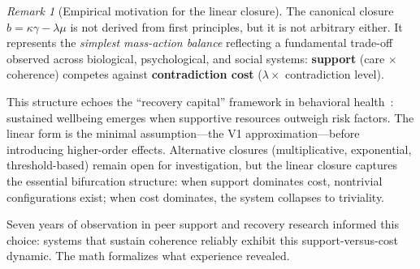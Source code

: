\documentclass[11pt]{article}
\theoremstyle{plain}
\theoremstyle{definition}
\theoremstyle{remark}
\newtheorem{remark}[theorem]{Remark}
\begin{document}
\begin{remark}[Empirical motivation for the linear closure]
The canonical closure \(b = \kappa\gamma - \lambda\mu\) is not derived from first principles, but it is not arbitrary either. It represents the \emph{simplest mass-action balance} reflecting a fundamental trade-off observed across biological, psychological, and social systems: \textbf{support} (care \(\times\) coherence) competes against \textbf{contradiction cost} (\(\lambda \times\) contradiction level).

This structure echoes the ``recovery capital'' framework in behavioral health~\cite{White2008,Granfield1999}: sustained wellbeing emerges when supportive resources outweigh risk factors. The linear form is the minimal assumption---the V1 approximation---before introducing higher-order effects. Alternative closures (multiplicative, exponential, threshold-based) remain open for investigation, but the linear closure captures the essential bifurcation structure: when support dominates cost, nontrivial configurations exist; when cost dominates, the system collapses to triviality.

Seven years of observation in peer support and recovery research informed this choice: systems that sustain coherence reliably exhibit this support-versus-cost dynamic. The math formalizes what experience revealed.
\end{remark}
\end{document}
